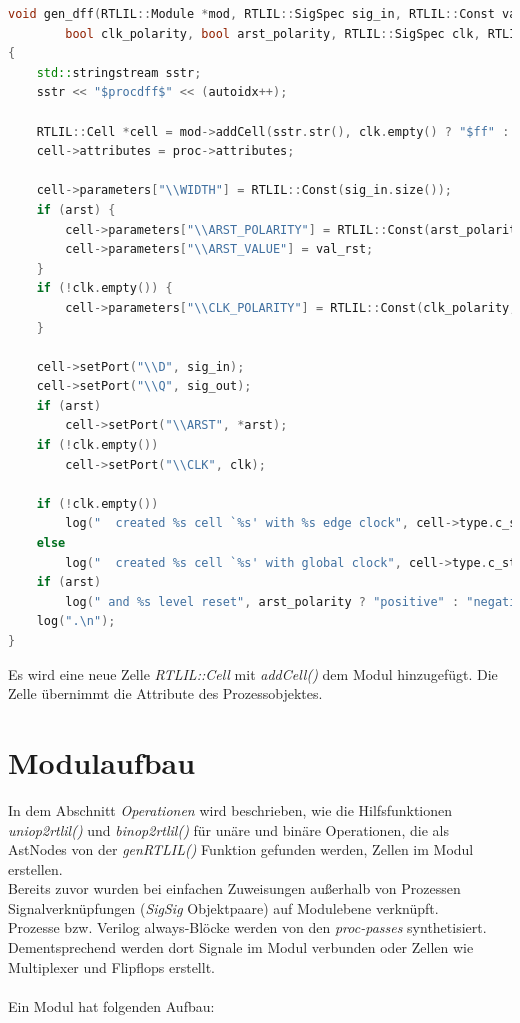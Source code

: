 \documentclass[11pt]{report}
\begin{document}
\begin{enumerate}
\begin{lstlisting}[language=C++]
void gen_dff(RTLIL::Module *mod, RTLIL::SigSpec sig_in, RTLIL::Const val_rst, RTLIL::SigSpec sig_out,
		bool clk_polarity, bool arst_polarity, RTLIL::SigSpec clk, RTLIL::SigSpec *arst, RTLIL::Process *proc)
{
	std::stringstream sstr;
	sstr << "$procdff$" << (autoidx++);

	RTLIL::Cell *cell = mod->addCell(sstr.str(), clk.empty() ? "$ff" : arst ? "$adff" : "$dff");
	cell->attributes = proc->attributes;

	cell->parameters["\\WIDTH"] = RTLIL::Const(sig_in.size());
	if (arst) {
		cell->parameters["\\ARST_POLARITY"] = RTLIL::Const(arst_polarity, 1);
		cell->parameters["\\ARST_VALUE"] = val_rst;
	}
	if (!clk.empty()) {
		cell->parameters["\\CLK_POLARITY"] = RTLIL::Const(clk_polarity, 1);
	}

	cell->setPort("\\D", sig_in);
	cell->setPort("\\Q", sig_out);
	if (arst)
		cell->setPort("\\ARST", *arst);
	if (!clk.empty())
		cell->setPort("\\CLK", clk);

	if (!clk.empty())
		log("  created %s cell `%s' with %s edge clock", cell->type.c_str(), cell->name.c_str(), clk_polarity ? "positive" : "negative");
	else
		log("  created %s cell `%s' with global clock", cell->type.c_str(), cell->name.c_str());
	if (arst)
		log(" and %s level reset", arst_polarity ? "positive" : "negative");
	log(".\n");
}
\end{lstlisting}
Es wird eine neue Zelle \textit{RTLIL::Cell} mit \textit{addCell()} dem Modul hinzugefügt. Die Zelle übernimmt die Attribute des Prozessobjektes. 


\end{enumerate}
\section{Modulaufbau}
In dem Abschnitt \textit{Operationen} wird beschrieben, wie die Hilfsfunktionen \textit{uniop2rtlil()} und \textit{binop2rtlil()} für unäre und binäre Operationen, die als AstNodes von der \textit{genRTLIL()} Funktion gefunden werden, Zellen im Modul erstellen.\\
Bereits zuvor wurden bei einfachen Zuweisungen außerhalb von Prozessen Signalverknüpfungen (\textit{SigSig} Objektpaare) auf Modulebene verknüpft.   
\\
Prozesse bzw. Verilog always-Blöcke werden von den \textit{proc-passes} synthetisiert. Dementsprechend werden dort Signale im Modul verbunden oder Zellen wie Multiplexer und Flipflops erstellt.
\\
\\
Ein Modul hat folgenden Aufbau:
\end{document}

